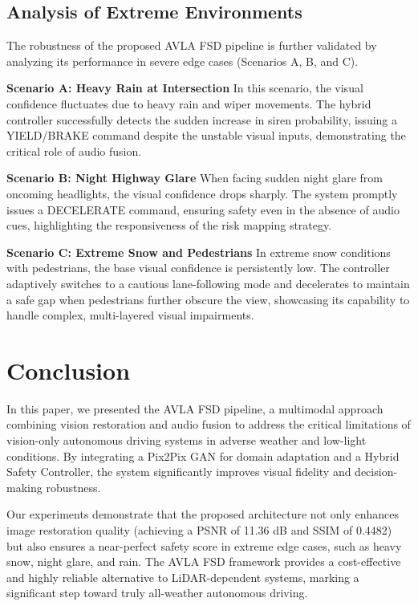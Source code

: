 \documentclass{article}
\begin{document}
\subsection{Analysis of Extreme Environments}
The robustness of the proposed AVLA FSD pipeline is further validated by analyzing its performance in severe edge cases (Scenarios A, B, and C).

\textbf{Scenario A: Heavy Rain at Intersection}\newline
In this scenario, the visual confidence fluctuates due to heavy rain and wiper movements. The hybrid controller successfully detects the sudden increase in siren probability, issuing a YIELD/BRAKE command despite the unstable visual inputs, demonstrating the critical role of audio fusion.

\textbf{Scenario B: Night Highway Glare}\newline
When facing sudden night glare from oncoming headlights, the visual confidence drops sharply. The system promptly issues a DECELERATE command, ensuring safety even in the absence of audio cues, highlighting the responsiveness of the risk mapping strategy.

\textbf{Scenario C: Extreme Snow and Pedestrians}\newline
In extreme snow conditions with pedestrians, the base visual confidence is persistently low. The controller adaptively switches to a cautious lane-following mode and decelerates to maintain a safe gap when pedestrians further obscure the view, showcasing its capability to handle complex, multi-layered visual impairments.

\section{Conclusion}

In this paper, we presented the AVLA FSD pipeline, a multimodal approach combining vision restoration and audio fusion to address the critical limitations of vision-only autonomous driving systems in adverse weather and low-light conditions. By integrating a Pix2Pix GAN for domain adaptation and a Hybrid Safety Controller, the system significantly improves visual fidelity and decision-making robustness.

Our experiments demonstrate that the proposed architecture not only enhances image restoration quality (achieving a PSNR of 11.36 dB and SSIM of 0.4482) but also ensures a near-perfect safety score in extreme edge cases, such as heavy snow, night glare, and rain. The AVLA FSD framework provides a cost-effective and highly reliable alternative to LiDAR-dependent systems, marking a significant step toward truly all-weather autonomous driving.
\end{document}
